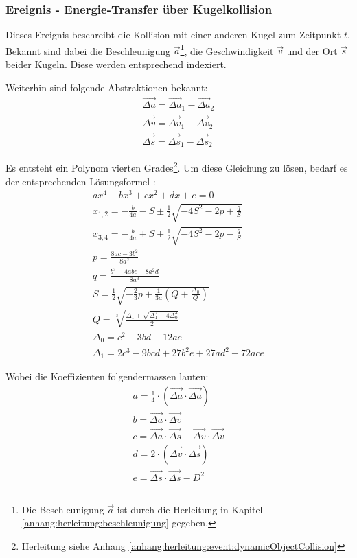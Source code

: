 \subsubsection{Ereignis - Energie-Transfer über Kugelkollision}
Dieses Ereignis beschreibt die Kollision mit einer anderen Kugel zum Zeitpunkt $t$.
Bekannt sind dabei die Beschleunigung $\vec{a}$\footnote{Die Beschleunigung $\vec{a}$ ist durch die Herleitung in Kapitel \ref{anhang:herleitung:beschleunigung}
gegeben.}, die Geschwindigkeit $\vec{v}$ und der Ort $\vec{s}$ beider Kugeln.
Diese werden entsprechend indexiert.

Weiterhin sind folgende Abstraktionen bekannt:
\begin{align}
    \vec{\Delta a} = \vec{\Delta a}_1 - \vec{\Delta a}_2\\
    \vec{\Delta v} = \vec{\Delta v}_1 - \vec{\Delta v}_2\\
    \vec{\Delta s} = \vec{\Delta s}_1 - \vec{\Delta s}_2
\end{align}

Es entsteht ein Polynom vierten Grades\footnote{Herleitung siehe Anhang \ref{anhang:herleitung:event:dynamicObjectCollision}}.
Um diese Gleichung zu lösen, bedarf es der entsprechenden Lösungsformel \cite{wiki.polynom:1}:
\begin{align}
    ax^4 + bx^3 + cx^2 + dx + e = 0\\
    x_{1,2} = -\frac{b}{4a} - S \pm \frac{1}{2}\sqrt{-4S^2 - 2p + \frac{q}{S}}\\
    x_{3,4} = -\frac{b}{4a} + S \pm \frac{1}{2}\sqrt{-4S^2 - 2p - \frac{q}{S}}\\
    p = \frac{8ac - 3b^2}{8a^2}\\
    q = \frac{b^3 - 4abc + 8a^{2}d}{8a^3}\\
    S = \frac{1}{2}\sqrt{-\frac{2}{3}p + \frac{1}{3a}(Q + \frac{\Delta_0}{Q})}\\
    Q = \sqrt[3]{\frac{\Delta_1 + \sqrt{\Delta_{1}^2 - 4\Delta_{0}^3}}{2}}\\
    \Delta_0 = c^2 - 3bd + 12ae\\
    \Delta_1 = 2c^3 - 9bcd + 27b^{2}e + 27ad^2 - 72ace
\end{align}

Wobei die Koeffizienten folgendermassen lauten:
\begin{align}
    a = \frac{1}{4} \cdot (\vec{\Delta a} \cdot \vec{\Delta a})\\
    b = \vec{\Delta a} \cdot \vec{\Delta v}\\
    c = \vec{\Delta a} \cdot \vec{\Delta s} + \vec{\Delta v} \cdot \vec{\Delta v}\\
    d = 2 \cdot (\vec{\Delta v} \cdot \vec{\Delta s})\\
    e = \vec{\Delta s} \cdot \vec{\Delta s} - D^2
\end{align}

